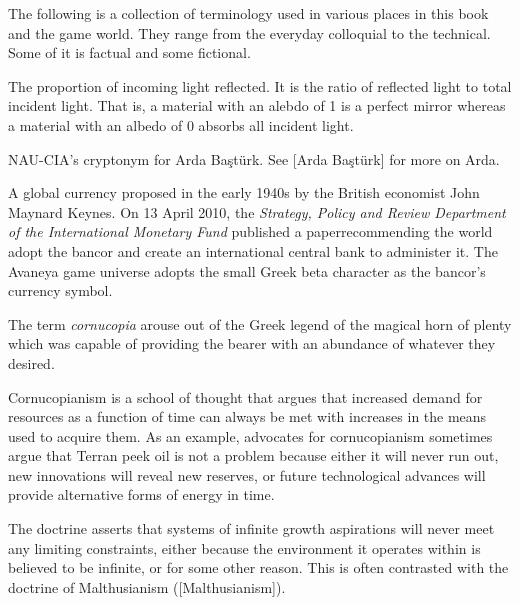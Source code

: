 

The following is a collection of terminology used in various places in this book and the game world. They range from the everyday colloquial to the technical. Some of it is factual and some fictional.

The proportion of incoming light reflected. It is the ratio of reflected light to total incident light. That is, a material with an alebdo of 1 is a perfect mirror whereas a material with an albedo of 0 absorbs all incident light.

NAU-CIA's cryptonym for Arda Baştürk. See [Arda Baştürk] for more on Arda.

A global currency proposed in the early 1940s by the British economist John Maynard Keynes. On 13 April 2010, the {\it Strategy, Policy and Review Department of the International Monetary Fund} published a paper recommending the world adopt the bancor and create an international central bank to administer it. The Avaneya game universe adopts the small Greek beta character  as the bancor's currency symbol.

The term {\it cornucopia} arouse out of the Greek legend of the magical horn of plenty which was capable of providing the bearer with an abundance of whatever they desired.

Cornucopianism is a school of thought that argues that increased demand for resources as a function of time can always be met with increases in the means used to acquire them. As an example, advocates for cornucopianism sometimes argue that Terran peek oil is not a problem because either it will never run out, new innovations will reveal new reserves, or future technological advances will provide alternative forms of energy in time. 

The doctrine asserts that systems of infinite growth aspirations will never meet any limiting constraints, either because the environment it operates within is believed to be infinite, or for some other reason. This is often contrasted with the doctrine of Malthusianism ([Malthusianism]).

